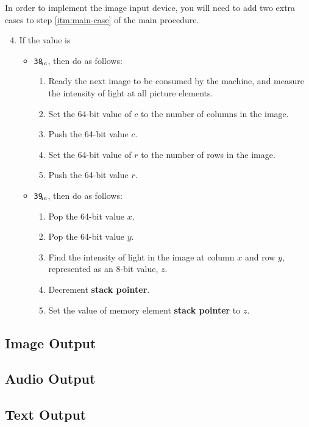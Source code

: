 \documentclass[a4paper,12pt]{article}
\newcommand{\num}[1]{\texttt{#1}\xspace}
\newcommand{\hex}[1]{\num{#1}$_{\textup{\tiny\hskip-1ex 16}}$\xspace}
\newcommand{\SP}{\textbf{stack pointer}\xspace}
\begin{document}
In order to implement the image input device, you will need to add two extra cases to step \ref{itm:main-case} of the main procedure.

\begin{enumerate}
  \setcounter{enumi}{3}
\item If the value is
  \begin{itemize}
  \item \hex{38}, then do as follows:
    \begin{enumerate}
    \item Ready the next image to be consumed by the machine, and measure the intensity of light at all picture elements.
    \item Set the 64-bit value of $c$ to the number of columns in the image.
    \item Push the 64-bit value $c$.
    \item Set the 64-bit value of $r$ to the number of rows in the image.
    \item Push the 64-bit value $r$.
    \end{enumerate}
  \item \hex{39}, then do as follows:
    \begin{enumerate}
    \item Pop the 64-bit value $x$.
    \item Pop the 64-bit value $y$.
    \item Find the intensity of light in the image at column $x$ and row $y$, represented as an 8-bit value, $z$.
    \item Decrement \SP.
    \item Set the value of memory element \SP to $z$.
    \end{enumerate}
  \end{itemize}
\end{enumerate}

\subsection{Image Output}

\subsection{Audio Output}

\subsection{Text Output}
\end{document}
